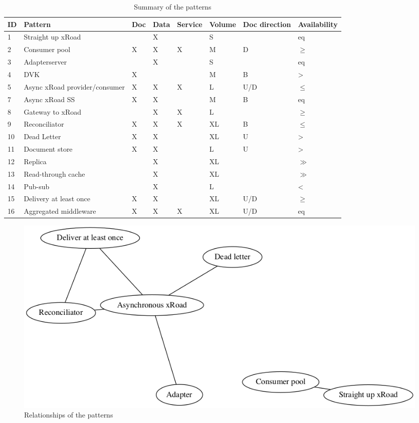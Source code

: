 \documentclass[10pt,a4paper]{article}
\begin{document}
\begin{table}
	\begin{center}
		\begin{tabular}{p{.6cm}p{3.4cm}p{.8cm}p{.8cm}p{.8cm}p{.8cm}p{1.2cm}p{1.2cm}}
		\toprule
ID & Pattern & Doc & Data & Service & Volume & Doc direction & Availability \\
\midrule
1 & Straight up xRoad &  & X &  & S &   & eq \\
2 & Consumer pool & X & X & X & M & D & $\geq$ \\
3 & Adapterserver &  & X &  & S &   & eq \\
4 & DVK & X &  &  & M & B & > \\
5 & Async xRoad provider/consumer & X & X & X & L & U/D & $\leq$ \\
7 & Async xRoad SS & X & X &  & M & B & eq \\
8 & Gateway to xRoad &  & X & X & L &   & $\geq$ \\
9 & Reconciliator & X & X & X & XL & B & $\leq$ \\
10 & Dead Letter & X & X &  & XL & U & > \\
11 & Document store & X & X &  & L & U & > \\
12 & Replica &  & X &  & XL &   & $\gg$ \\
13 & Read-through cache &  & X &  & XL &   & $\gg$ \\
14 & Pub-sub &  & X &  & L &  & < \\
15 & Delivery at least once & X & X & & XL & U/D & $\geq$ \\
16 & Aggregated middleware & X & X & X & XL & U/D & eq \\
\bottomrule
		\end{tabular}
		\caption{Summary of the patterns}
		\label{tab:dir}
	\end{center}
\end{table}

\begin{figure}[htp]
	\begin{center}
		\includegraphics[width=1\textwidth]{gfx/patterns.png}
		\caption{Relationships of the patterns}
		\label{fig:patterns}
	\end{center}
\end{figure}
\end{document}
